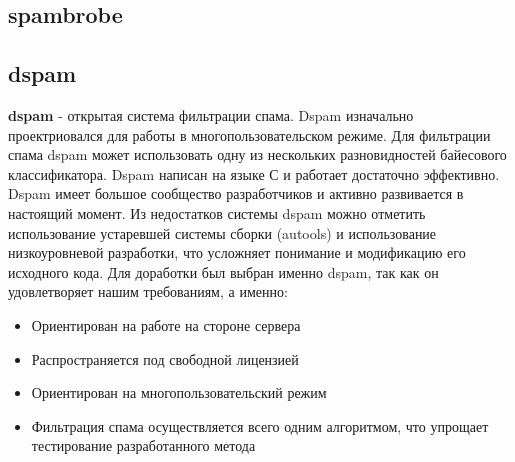 \subsection{spambrobe}

\subsection{dspam}
\textbf{dspam} - открытая система фильтрации спама. Dspam изначально проектриовался для работы в многопользовательском режиме.
Для фильтрации спама dspam может использовать одну из нескольких разновидностей байесового классификатора.
Dspam написан на языке С и работает достаточно эффективно. Dspam имеет большое сообщество разработчиков и активно развивается в настоящий момент.
Из недостатков системы dspam можно отметить использование устаревшей системы сборки (autools) и использование низкоуровневой разработки, что усложняет понимание и модификацию его исходного кода.
Для доработки был выбран именно dspam, так как он удовлетворяет нашим требованиям, а именно:
\begin{itemize}
\item Ориентирован на работе на стороне сервера
\item Распространяется под свободной лицензией
\item Ориентирован на многопользовательский режим
\item Фильтрация спама осуществляется  всего одним алгоритмом, что упрощает тестирование разработанного метода
\end{itemize}
